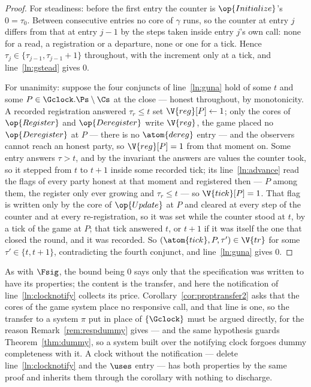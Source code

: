 \documentclass[10pt,oneside,openany]{book}
\theoremstyle{accentdef}
\theoremstyle{accentplain}
\begin{document}
\begin{proof}
For steadiness: before the first entry the counter is $\op{Initialize}$'s $0 = \tau_0$. Between
consecutive entries no core of $\gamma$ runs, so the counter at entry $j$ differs from that at
entry $j-1$ by the steps taken inside entry $j$'s own call: none for a read, a registration or a
departure, none or one for a tick. Hence $\tau_j \in \{\tau_{j-1}, \tau_{j-1}+1\}$ throughout,
with the increment only at a tick, and line~\ref{ln:gstead} gives $0$.

For unanimity: suppose the four conjuncts of line~\ref{ln:guna} hold of some $t$ and some
$P \in \Gclock.\Ps \setminus \Cs$ at the close --- honest throughout, by monotonicity. A recorded
registration answered $\tau_r \leq t$ set $\V{reg}[P] \gets 1$; only the cores of $\op{Register}$
and $\op{Deregister}$ write $\V{reg}$, the game placed no $\op{Deregister}$ at $P$ --- there is
no $\atom{dereg}$ entry --- and the observers cannot reach an honest party, so $\V{reg}[P] = 1$
from that moment on. Some entry answers $\tau > t$, and by the invariant the answers are values
the counter took, so it stepped from $t$ to $t+1$ inside some recorded tick; its
line~\ref{ln:advance} read the flags of every party honest at that moment and registered then ---
$P$ among them, the register only ever growing and $\tau_r \leq t$ --- so $\V{tick}[P] = 1$. That
flag is written only by the core of $\op{Update}$ at $P$ and cleared at every step of the counter
and at every re-registration, so it was set while the counter stood at $t$, by a tick of the game
at $P$; that tick answered $t$, or $t+1$ if it was itself the one that closed the round, and it
was recorded. So $(\atom{tick},P,\tau') \in \V{tr}$ for some $\tau' \in \{t,t+1\}$, contradicting
the fourth conjunct, and line~\ref{ln:guna} gives $0$.
\end{proof}

As with $\Fsig$, the bound being $0$ says only that the specification was written to have its
properties; the content is the transfer, and here the notification of line~\ref{ln:clocknotify}
collects its price. Corollary~\ref{cor:proptransfer2} asks that the cores of the game system
place no responsive call, and that line is one, so the transfer to a system $\pi$ put in place of
$\{\Gclock\}$ must be argued directly, for the reason Remark~\ref{rem:respdummy} gives --- and
the same hypothesis guards Theorem~\ref{thm:dummy}, so a system built over the notifying clock
forgoes dummy completeness with it. A clock without the notification --- delete
line~\ref{ln:clocknotify} and the $\uses$ entry --- has both properties by the same proof and
inherits them through the corollary with nothing to discharge.
\end{document}
